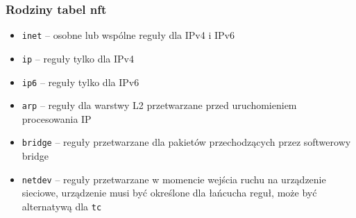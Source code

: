 \documentclass[12pt,aspectratio=169]{beamer}
\begin{document}
\begin{frame}[fragile]

\frametitle{Rodziny tabel nft}

\begin{itemize}
	\item \Verb#inet#   – osobne lub wspólne reguły dla IPv4 i IPv6
	\item \Verb#ip#     – reguły tylko dla IPv4
	\item \Verb#ip6#    – reguły tylko dla IPv6
	\item \Verb#arp#    – reguły dla warstwy L2 przetwarzane przed uruchomieniem procesowania IP
	\item \Verb#bridge# – reguły przetwarzane dla pakietów przechodzących przez softwerowy bridge
	\item \Verb#netdev# – reguły przetwarzane w momencie wejścia ruchu na urządzenie sieciowe, urządzenie musi być określone dla łańcucha reguł, może być alternatywą dla \Verb#tc#
\end{itemize}

\end{frame}
\end{document}
